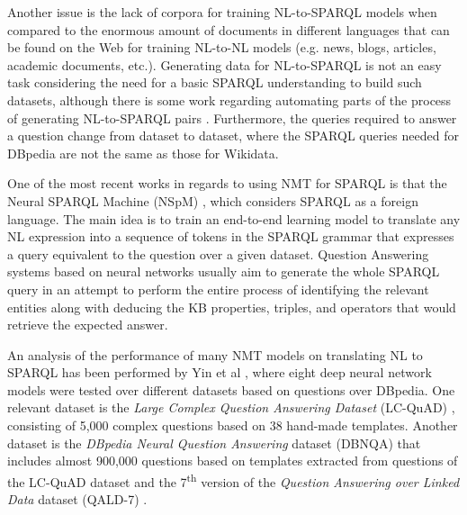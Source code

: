 Another issue is the lack of corpora for training NL-to-SPARQL models when compared to 
the enormous amount of documents in different languages that can be found on the Web for 
training NL-to-NL models (e.g. news, blogs, articles, academic documents, etc.). Generating 
data for NL-to-SPARQL is not an easy task considering the need for a basic SPARQL understanding 
to build such datasets, although there is some work regarding automating parts 
of the process of generating NL-to-SPARQL pairs \cite{dataset:dbnqa-hartmann-marx-soru-2018, dataset:lcquad-TrivediMDL17}. 
Furthermore, the queries required to answer a question change from dataset to dataset, where the SPARQL queries needed for 
DBpedia are not the same as those for Wikidata.

One of the most recent works in regards to using NMT for SPARQL is that 
the Neural SPARQL Machine (NSpM) \cite{nmt:nspm-SoruMMPVEN17}, which considers SPARQL as a foreign language. 
The main idea is to train an end-to-end learning model to translate any NL expression 
into a sequence of tokens in the SPARQL grammar that expresses a query equivalent to the 
question over a given dataset. Question Answering systems based on neural networks usually 
aim to generate the whole SPARQL query in an attempt to perform the entire process of 
identifying the relevant entities along with deducing the KB properties, triples, and operators 
that would retrieve the expected answer. 

An analysis of the performance of many NMT models on translating NL to SPARQL 
has been performed by Yin et al \cite{nmt:nl-to-sparql-Yin19}, where eight deep neural network models were tested 
over different datasets based on questions over DBpedia. One relevant dataset is the \textit{Large 
Complex Question Answering Dataset} (LC-QuAD) \cite{dataset:lcquad-TrivediMDL17}, consisting of 5,000 complex questions 
based on 38 hand-made templates. Another dataset is the \textit{DBpedia Neural Question Answering} 
dataset (DBNQA) \cite{dataset:dbnqa-hartmann-marx-soru-2018} that includes almost 900,000 questions based on templates extracted 
from questions of the LC-QuAD dataset and the 7\textsuperscript{th} version of the \textit{Question Answering over 
Linked Data} dataset (QALD-7) \cite{dataset:qald7-UsbeckNHKRN17}.

